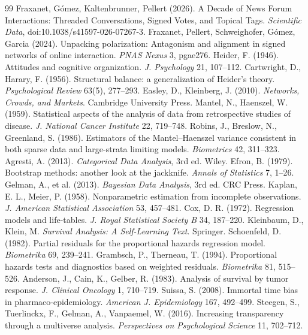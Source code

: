 \documentclass[11pt,a4paper]{article}
\begin{document}
\begin{thebibliography}{99}\small
{} Fraxanet, G\'omez, Kaltenbrunner, Pellert (2026). A Decade of News Forum Interactions: Threaded Conversations, Signed Votes, and Topical Tags. \emph{Scientific Data}, doi:10.1038/s41597-026-07267-3.
 Fraxanet, Pellert, Schweighofer, G\'omez, Garcia (2024). Unpacking polarization: Antagonism and alignment in signed networks of online interaction. \emph{PNAS Nexus} 3, pgae276.
 Heider, F. (1946). Attitudes and cognitive organization. \emph{J. Psychology} 21, 107--112.
 Cartwright, D., Harary, F. (1956). Structural balance: a generalization of Heider's theory. \emph{Psychological Review} 63(5), 277--293.
 Easley, D., Kleinberg, J. (2010). \emph{Networks, Crowds, and Markets}. Cambridge University Press.
 Mantel, N., Haenszel, W. (1959). Statistical aspects of the analysis of data from retrospective studies of disease. \emph{J. National Cancer Institute} 22, 719--748.
 Robins, J., Breslow, N., Greenland, S. (1986). Estimators of the Mantel--Haenszel variance consistent in both sparse data and large-strata limiting models. \emph{Biometrics} 42, 311--323.
 Agresti, A. (2013). \emph{Categorical Data Analysis}, 3rd ed. Wiley.
 Efron, B. (1979). Bootstrap methods: another look at the jackknife. \emph{Annals of Statistics} 7, 1--26.
 Gelman, A., et al. (2013). \emph{Bayesian Data Analysis}, 3rd ed. CRC Press.
 Kaplan, E. L., Meier, P. (1958). Nonparametric estimation from incomplete observations. \emph{J. American Statistical Association} 53, 457--481.
 Cox, D. R. (1972). Regression models and life-tables. \emph{J. Royal Statistical Society B} 34, 187--220.
 Kleinbaum, D., Klein, M. \emph{Survival Analysis: A Self-Learning Text}. Springer.
 Schoenfeld, D. (1982). Partial residuals for the proportional hazards regression model. \emph{Biometrika} 69, 239--241.
 Grambsch, P., Therneau, T. (1994). Proportional hazards tests and diagnostics based on weighted residuals. \emph{Biometrika} 81, 515--526.
 Anderson, J., Cain, K., Gelber, R. (1983). Analysis of survival by tumor response. \emph{J. Clinical Oncology} 1, 710--719.
 Suissa, S. (2008). Immortal time bias in pharmaco-epidemiology. \emph{American J. Epidemiology} 167, 492--499.
 Steegen, S., Tuerlinckx, F., Gelman, A., Vanpaemel, W. (2016). Increasing transparency through a multiverse analysis. \emph{Perspectives on Psychological Science} 11, 702--712.

\end{thebibliography}
\end{document}
